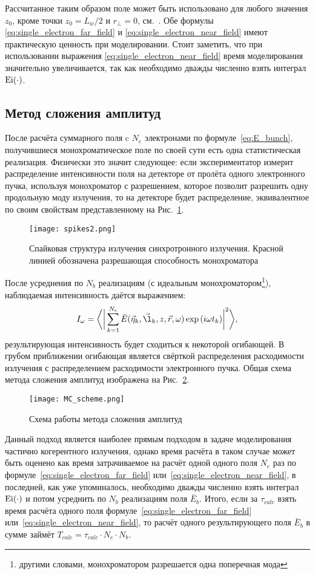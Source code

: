Рассчитанное таким образом поле может быть использовано для любого значения $z_0$, кроме точки $z_0 = L_w/2$ и $r_{\bot} = 0$, см.~\cite{geloni_fourier_2007}. Обе формулы \ref{eq:single_electron_far_field} и \ref{eq:single_electron_near_field} имеют практическую ценность при моделировании. Стоит заметить, что при использовании выражения \ref{eq:single_electron_near_field} время моделирования значительно увеличивается, так как необходимо дважды численно взять интеграл $\textup{Ei}(\cdot)$.
 
\subsection{Метод сложения амплитуд}
После расчёта суммарного поля c $N_e$ электронами по формуле~\ref{eq:E_bunch}, получившиеся монохроматическое поле по своей сути есть одна статистическая реализация. Физически это значит следующее: если экспериментатор измерит распределение интенсивности поля на детекторе от пролёта одного электронного пучка, используя монохроматор с разрешением, которое позволит разрешить одну продольную моду излучения, то на детекторе будет распределение, эквивалентное по своим свойствам представленному на Рис.~\ref{fig:spikes2}. 
\begin{figure}[H]
	\centering 	\texttt{[image: spikes2.png]}
	\caption{Спайковая структура излучения синхротронного излучения. Красной линией обозначена разрешающая способность монохроматора}
	\label{fig:spikes2}
\end{figure}
После усреднения по $N_b$ реализациям (с идеальным монохроматором\footnote{другими словами, монохроматором разрешается одна поперечная мода}), наблюдаемая интенсивность даётся выражением: 
\begin{align}
	I_{\omega} = \bigg \langle \bigg|\sum\limits_{k=1}^{N_e} \bar{E}(\vec{\eta}_k, \vec{\l}_k, z, \vec{r}, \omega) \exp{(i \omega t_k)}\bigg|^2 \bigg \rangle,
	\label{eq:I_MC} 
\end{align}
\noindent результирующая интенсивность будет сходиться к некоторой огибающей. В грубом приближении огибающая является свёрткой распределения расходимости излучения с распределением расходимости электронного пучка. Общая схема метода сложения амплитуд изображена на Рис.~\ref{fig:MC_scheme}. 
\begin{figure}[H] 
	\centering 	\texttt{[image: MC\_scheme.png]}
	\caption{Схема работы метода сложения амплитуд}
	\label{fig:MC_scheme}
\end{figure}
Данный подход является наиболее прямым подходом в задаче моделирования частично когерентного излучения, однако время расчёта в таком случае может быть оценено как время затрачиваемое на расчёт одной одного поля $N_e$ раз по формуле~\ref{eq:single_electron_far_field} или~\ref{eq:single_electron_near_field}, в последней, как уже упоминалось, необходимо дважды численно взять интеграл $\textup{Ei}(\cdot)$ и потом усреднить по $N_b$ реализациям поля $\bar{E}_{b}$. Итого, если за $\tau_{calc}$ взять время расчёта одного поля формуле~\ref{eq:single_electron_far_field} или~\ref{eq:single_electron_near_field}, то расчёт одного результирующего поля $\bar{E}_{b}$ в сумме займёт $T_{calc} = \tau_{calc} \cdot N_e \cdot N_b$.

